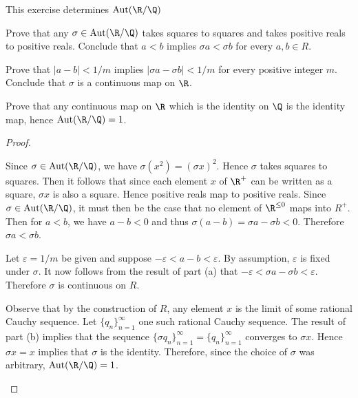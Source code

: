 \documentclass[10pt]{amsart}
\begin{document}
\begin{6}
  \newcommand{\Aut}{\operatorname{Aut}}
  \label{Ex6}
  This exercise determines $\Aut(\R/\Q)$
  \begin{alphaenum}
    \item
      Prove that any $\sigma \in \Aut(\R/\Q)$ takes squares to squares and takes positive reals to positive reals.
      Conclude that $a < b$ implies $\sigma a < \sigma b$ for every $a,b \in R$.
    \item
      Prove that $|a - b| < 1/m$ implies $|\sigma a - \sigma b|< 1/m$ for every positive integer $m$. 
      Conclude that $\sigma$ is a continuous map on $\R$.
    \item
      Prove that any continuous map on $\R$ which is the identity on $\Q$ is the identity map, hence $\Aut(\R/\Q) = 1$.
  \end{alphaenum}

  \begin{proof}
    \begin{alphaenum}
    \item
      Since $\sigma \in \Aut(\R/\Q)$, we have $\sigma(x^2) = (\sigma x)^2$.
      Hence $\sigma$ takes squares to squares.
      Then it follows that since each element $x$ of $\R^+$ can be written as a square, $\sigma x$ is also a square.
      Hence positive reals map to positive reals.
      Since $\sigma \in \Aut(\R/\Q)$, it must then be the case that no element of $\R^{\leq 0}$ maps into $R^+$. 
      Then for $a < b$, we have $a - b < 0$ and thus $\sigma (a - b) = \sigma a - \sigma b < 0$.
      Therefore $\sigma a < \sigma b$.
    \item
      Let $\varepsilon = 1/m$ be given and suppose $-\varepsilon < a-b < \varepsilon$.
      By assumption, $\varepsilon$ is fixed under $\sigma$.
      It now follows from the result of part (a) that $-\varepsilon < \sigma a - \sigma b < \varepsilon$.
      Therefore $\sigma$ is continuous on $R$.
    \item
      Observe that by the construction of $R$, any element $x$ is the limit of some rational Cauchy sequence.
      Let $\{q_n\}_{n=1}^{\infty}$ one such rational Cauchy sequence.
      The result of part (b) implies that the sequence $\{\sigma q_n\}_{n=1}^{\infty} = \{q_n\}_{n=1}^{\infty}$ converges to $\sigma x$.
      Hence $\sigma x = x$ implies that $\sigma$ is the identity.
      Therefore, since the choice of $\sigma$ was arbitrary, $\Aut(\R/\Q) = 1$.
    \end{alphaenum}
  \end{proof}
\end{6}
\end{document}
